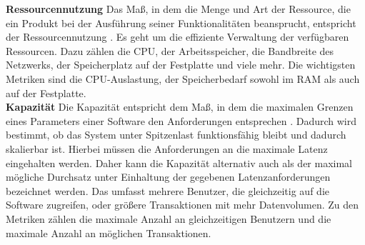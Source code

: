 \noindent
\textbf{Ressourcennutzung}\newline
Das Maß, in dem die Menge und Art der Ressource, die ein Produkt bei der Ausführung seiner Funktionalitäten beansprucht, entspricht der Ressourcennutzung \cite{ISOIEC.}. Es geht um die effiziente Verwaltung der verfügbaren Ressourcen. Dazu zählen die CPU, der Arbeitsspeicher, die Bandbreite des Netzwerks, der Speicherplatz auf der Festplatte und viele mehr. Die wichtigsten Metriken sind die CPU-Auslastung, der Speicherbedarf sowohl im RAM als auch auf der Festplatte.\cite{Barbacci.1995}\\

\noindent
\textbf{Kapazität}\newline
Die Kapazität entspricht dem Maß, in dem die maximalen Grenzen eines Parameters einer Software den Anforderungen entsprechen \cite{ISOIEC.}. Dadurch wird bestimmt, ob das System unter Spitzenlast funktionsfähig bleibt und dadurch skalierbar ist. Hierbei müssen die Anforderungen an die maximale Latenz eingehalten werden. Daher kann die Kapazität alternativ auch als der maximal mögliche Durchsatz unter Einhaltung der gegebenen Latenzanforderungen bezeichnet werden. Das umfasst mehrere Benutzer, die gleichzeitig auf die Software zugreifen, oder größere Transaktionen mit mehr Datenvolumen. Zu den Metriken zählen die maximale Anzahl an gleichzeitigen Benutzern und die maximale Anzahl an möglichen Transaktionen.\cite{Barbacci.1995}